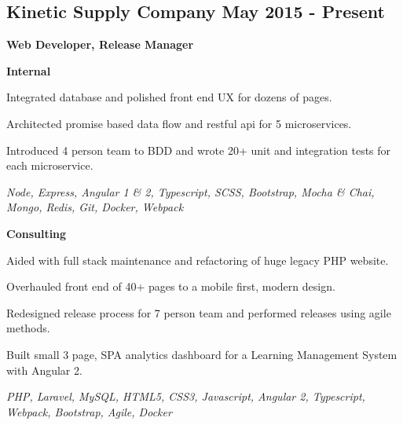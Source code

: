 \documentclass[letterpaper]{article}
\renewenvironment{itemize}{
  \begin{list}{}{
    \setlength{\leftmargin}{1.5em}
  }
}{
  \end{list}
}
\begin{document}
\subsection*{Kinetic Supply Company \hfill May 2015 - Present}
\begin{itemize}
\item \textbf{Web Developer, Release Manager}
  \begin{itemize}
  \item \textbf{Internal}
  \item Integrated database and polished front end UX for dozens of pages.
  \item Architected promise based data flow and restful api for 5 microservices.
  \item Introduced 4 person team to BDD and wrote 20+ unit and integration tests for each microservice.
  \end{itemize}
  
  \begin{itemize}
  \item \textit{Node, Express, Angular 1 \& 2, Typescript, SCSS, Bootstrap, \small{Mocha \& Chai}, Mongo, Redis, Git, Docker, Webpack}
  \end{itemize}
  
  \begin{itemize}
  \item \textbf{Consulting}
  \item Aided with full stack maintenance and refactoring of huge legacy PHP website.
  \item Overhauled front end of 40+ pages to a mobile first, modern design.
  \item Redesigned release process for 7 person team and performed releases using agile methods.
  \item Built small 3 page, SPA analytics dashboard for a Learning Management System with Angular 2.
  \end{itemize}

  \begin{itemize}
  \item \textit{PHP, Laravel, MySQL, HTML5, CSS3, Javascript, Angular 2, Typescript, Webpack, Bootstrap, Agile, Docker}
  \end{itemize}
\end{itemize}
\end{document}
